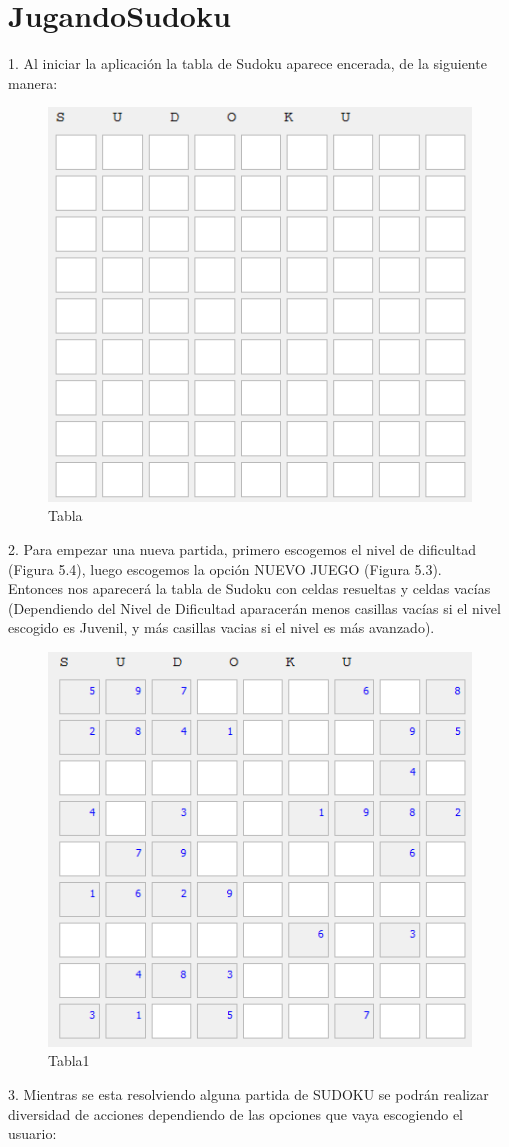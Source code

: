 \section{JugandoSudoku}

1. Al iniciar la aplicación la tabla de Sudoku aparece encerada, de la siguiente manera:

\begin{figure}[htbp]
\begin{center}
\includegraphics[width=.42\textwidth]{./imagenes/Tabla.png}
\caption{Tabla}
\label{Tabla}
\end{center}
\end{figure}


2. Para empezar una nueva partida, primero escogemos el nivel de dificultad (Figura 5.4), luego escogemos la opción NUEVO JUEGO (Figura 5.3). \\ Entonces nos aparecerá la tabla de Sudoku con celdas resueltas y celdas vacías (Dependiendo del Nivel de Dificultad aparacerán menos casillas vacías si el nivel escogido es Juvenil, y más casillas vacias si el nivel es más avanzado).


\begin{figure}[htbp]
\begin{center}
\includegraphics[width=.42\textwidth]{./imagenes/Tabla1.png}
\caption{Tabla1}
\label{Tabla1}
\end{center}
\end{figure}


3. Mientras se esta resolviendo alguna partida de SUDOKU se podrán realizar diversidad de acciones dependiendo de las opciones que vaya escogiendo el usuario: 

